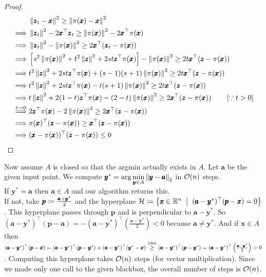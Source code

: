 \begin{enumerate}[label=(\alph*)]
\begin{proof}
\begin{align*}
&\left\lVert \pmb z_{t}-\pmb x \right\rVert_{}^{2} \ge \left\lVert \pi(\pmb x)-\pmb x \right\rVert_{}^{2} \\
\implies& \left\lVert \pmb z_{t} \right\rVert_{}^{2} - 2\pmb x^{\top}\pmb z_{t} \ge \left\lVert \pi(\pmb x) \right\rVert_{}^{2}-2\pmb x^{\top}\pi(\pmb x)\\
\implies& \left\lVert \pmb z_{t} \right\rVert_{}^{2} - \left\lVert \pi(\pmb x) \right\rVert_{}^{2} \ge 2\pmb x^{\top}(\pmb z_{t}-\pi(\pmb x))\\ 
\implies &\left[s^{2}\left\lVert \pi(\pmb x) \right\rVert_{}^{2} + t^{2}\left\lVert \pmb z \right\rVert_{}^{2}+ 2st\pmb z^{\top}\pi(\pmb x)\right] - \left\lVert \pi(\pmb x) \right\rVert_{}^{2}\ge  2t\pmb x^{\top}(\pmb z-\pi(\pmb x))\\
\implies& t^{2}\left\lVert \pmb z \right\rVert_{}^{2}+ 2st\pmb z^{\top}\pi(\pmb x) + (s-1)(s+1)\left\lVert \pi(\pmb x) \right\rVert_{}^{2} \ge 2t\pmb x^{\top}(\pmb z-\pi(\pmb x))\\
\implies & t^{2}\left\lVert \pmb z \right\rVert_{}^{2}+ 2st\pmb z^{\top}\pi(\pmb x) - t(s+1)\left\lVert \pi(\pmb x) \right\rVert_{}^{2} \ge 2t\pmb x^{\top}(\pmb z-\pi(\pmb x))\\
\implies & t\left\lVert \pmb z \right\rVert_{}^{2}+ 2(1-t)\pmb z^{\top}\pi(\pmb x) - (2-t)\left\lVert \pi(\pmb x) \right\rVert_{}^{2} \ge 2\pmb x^{\top}(\pmb z-\pi(\pmb x)) ~~~~~~\left[\because t>0\right]\\
\stackrel{t\to0}{\implies}& 2\pmb z^{\top}\pi(\pmb x) - 2\left\lVert \pi(\pmb x) \right\rVert_{}^{2} \ge 2\pmb x^{\top}(\pmb z-\pi(\pmb x))\\
\implies & \pi(\pmb x)^{\top}(\pmb z-\pi(\pmb x)) \ge \pmb x^{\top} (\pmb z-\pi(\pmb x))\\
\implies &(\pmb x-\pi(\pmb x))^{\top} (\pmb z-\pi(\pmb x)) \le 0
\end{align*}
\end{proof}

Now assume $A$ is closed so that the argmin actually exists in $A$. Let $\pmb a$ be the given input point. We compute $\displaystyle \pmb y^{*} = \arg \min_{\pmb y\in A} \left\lVert \pmb y-\pmb a \right\rVert_{2}$ in ${\mathcal{O}}(n)$ steps. \\
If $\pmb y^{*} = \pmb a$ then $\pmb a\in A$ and our algorithm returns this. \\
If not, take $\pmb p \coloneqq \frac{\pmb a+\pmb y^{*}}{2}$ and the hyperplane $\cH \sett \set{\pmb x\in \R^{n} \st (\pmb a-\pmb y^{*})^{\top}(\pmb p-\pmb x) = 0}$. This hyperplane passes through $\pmb p$ and is perpendicular to $\pmb a-\pmb y^{*}$. So $(\pmb a-\pmb y^{*})^{\top}(\pmb p - \pmb a) = -(\pmb a-\pmb y^{*})^{\top}\left(\frac{\pmb a-\pmb y^{*}}{2}\right) < 0$ because $\pmb a\ne \pmb y^{*}$. And if $\pmb x\in A$ then $(\pmb a-\pmb y^{*})^{\top}(\pmb p-\pmb x) = (\pmb a-\pmb y^{*})^{\top}(\pmb p-\pmb y^{*}) + (\pmb a-\pmb y^{*})^{\top}(\pmb y^{*}-\pmb x) \stackrel{\text{\Cref{obs}}}{\ge} (\pmb a-\pmb y^{*})^{\top}(\pmb p - \pmb y^{*}) = (\pmb a-\pmb y^{*})^{\top}\left(\frac{\pmb a - \pmb y^{*}}2\right) > 0$. Computing this hyperplane takes ${\mathcal{O}}(n)$ steps (for vector multiplication). Since we made only one call to the given blackbox, the overall number of steps is ${\mathcal{O}}(n)$.


\end{enumerate}
